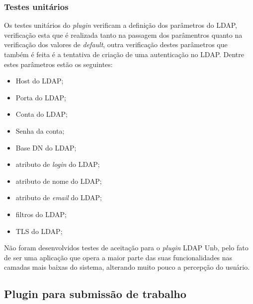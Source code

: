 
\subsubsection{Testes unitários}
%
Os testes unitários do \textit{plugin} verificam a definição dos parâmetros do LDAP, verificação esta que é realizada tanto na passagem dos parâmentros quanto na verificação dos valores de \textit{default}, outra verificação destes parâmetros que também é feita é a tentativa de criação de uma autenticação no LDAP. Dentre estes parâmetros estão os seguintes:

\begin{itemize}
\item Host do LDAP;
\item Porta do LDAP;
\item Conta do LDAP;
\item Senha da conta;
\item Base DN do LDAP;
\item atributo de \textit{login} do LDAP;
\item atributo de nome do LDAP;
\item atributo de \textit{email} do LDAP;
\item filtros do LDAP;
\item TLS do LDAP;
\end{itemize}

Não foram desenvolvidos testes de aceitação para o \textit{plugin} LDAP Unb, pelo fato de ser uma aplicação que opera a maior parte das suas funcionalidades nas camadas mais baixas do sistema, alterando muito pouco a percepção do usuário.

\subsection{Plugin para submissão de trabalho}

